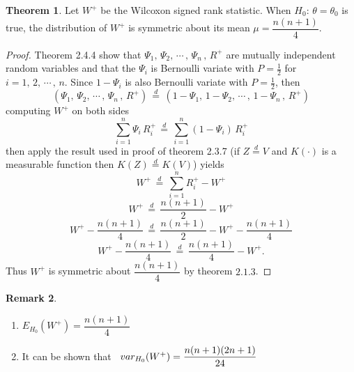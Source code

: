 \documentclass[12pt,a4paper]{report}
\theoremstyle{definition}
\newtheorem{thm}{Theorem}[section]
\newtheorem{remark}[thm]{Remark}
\theoremstyle{plain}
\begin{document}
\begin{thm}
Let $W^+$ be the Wilcoxon signed rank statistic. When $H_0:\, \theta = \theta_0$ is true, the distribution of $W^+$ is symmetric about its mean $\mu = \dfrac{n(n + 1)}{4}$.
\end{thm}

\begin{proof}
Theorem 2.4.4 show that $\Psi_1, \, \Psi_2, \, \cdots\, , \, \Psi_n\, , \, R^+$ are mutually independent random variables and that the $\Psi_i$ is Bernoulli variate with $P = \frac{1}{2}$ for $i = 1, \, 2, \, \cdots\, , \, n$. Since $1 - \Psi_i$ is also Bernoulli variate with $P = \frac{1}{2}$, then 
$$\left(\Psi_1, \, \Psi_2, \, \cdots\, , \, \Psi_n\, , \, R^+\right) \, \overset{d}{=}\, \left(1-\Psi_1, \, 1-\Psi_2, \, \cdots\, , \, 1-\Psi_n\, , \, R^+\right)$$ computing $W^+$ on both sides
$$\sum^n_{i = 1}\Psi_i\, R^+_i \, \overset{d}{=}\, \sum^n_{i = 1} \left(1 - \Psi_i\right)\, R^+_i$$
then apply the result used in proof of theorem 2.3.7 (if $Z \overset{d}{=} V$ and $K(\cdot)$  is a measurable function then $K(Z) \overset{d}{=} K(V)$) yields 
$$W^+ \, \overset{d}{=}\, \sum^n_{i = 1} R^+_i - W^+$$
$$W^+ \, \overset{d}{=}\, \frac{n(n  + 1)}{2} - W^+$$
$$W^+ - \frac{n(n+1)}{4}\, \overset{d}{=}\, \frac{n(n+1)}{2} - W^+ - \frac{n(n+1)}{4}$$
$$W^+ - \frac{n(n+1)}{4}\, \overset{d}{=}\, \frac{n(n+1)}{4} - W^+.$$
Thus $W^+$ is symmetric about $\dfrac{n(n+1)}{4}$ by theorem $2.1.3$.
\end{proof}



\begin{remark}
\begin{enumerate}
\item[(i)] $E_{H_0}(W^+) = \dfrac{n(n+1)}{4}$

\item[(ii)] It can be shown that $\hspace{0.2cm} var_{H_0}(W^+) = \dfrac{n(n+1)(2n+1)}{24}$
\end{enumerate}
\end{remark}


















\end{document}
